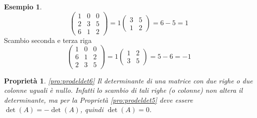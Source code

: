 \documentclass{book}
\theoremstyle{definition}
\newtheorem{es}{Esempio}[section]
\theoremstyle{plain}
\newtheorem{pro}{Proprietà}[section]
\begin{document}
\begin{es}
  \label{es:prodeldet5}
  \begin{equation*}
    \begin{pmatrix}
      1 & 0 & 0\\
      2 & 3 & 5\\
      6 & 1 & 2
    \end{pmatrix}=1
    \begin{pmatrix}
      3 & 5\\
      1 & 2
    \end{pmatrix}= 6-5=1
  \end{equation*}
  Scambio seconda e terza riga
  \begin{equation*}
    \begin{pmatrix}
      1 & 0 & 0 \\
      6 & 1 & 2 \\
      2 & 3 & 5
    \end{pmatrix}=1
    \begin{pmatrix}
      1 & 2\\
      3 & 5
    \end{pmatrix}=5-6=-1
  \end{equation*}
\end{es}
\begin{pro}
  \ref{pro:prodeldet6}
  Il determinante di una matrice con due righe o due colonne uguali
  è nullo. Infatti lo scambio di tali righe (o colonne) non altera il
  determinante, ma per la Proprietà \ref{pro:prodeldet5} deve essere
  $\det (A)=-\det(A)$, quindi $\det(A)=0$.
\end{pro}
\end{document}
